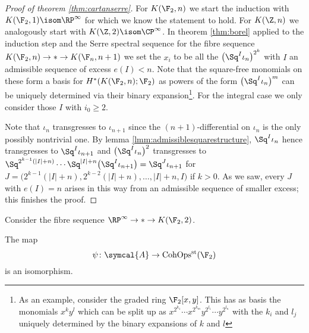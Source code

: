 \begin{proof}[Proof of theorem \ref{thm:cartanserre}]
	For $K(\F_2, n)$ we start the induction with $K(\F_2, 1) \isom \RP^\infty$ for which we know the statement to hold.
	For $K(\Z, n)$ we analogously start with $K(\Z, 2) \isom \CP^\infty$.
	In theorem \ref{thm:borel} applied to the induction step and the Serre spectral sequence for the fibre sequence $K(\F_2, n) \to * \to K(\F_n, n + 1)$ we set the $x_i$ to be all the $\big(\Sq^I \iota_n\big)^{2^k}$ with $I$ an admissible sequence of excess $e(I) < n$.
	Note that the square-free monomials on these form a basis for $H^*(K(\F_2, n); \F_2)$ as powers of the form $\big(\Sq^I \iota_n\big)^m$ can be uniquely determined via their binary expansion\footnote{As an example, consider the graded ring $\F_2[x, y]$. This has as basis the monomials $x^k y^l$ which can be split up as $x^{2^{k_1}} \cdots x^{2^{k_m}} y^{2^{l_1}} \cdots y^{2^{l_n}}$ with the $k_i$ and $l_j$ uniquely determined by the binary expansions of $k$ and $l$}.
	For the integral case we only consider those $I$ with $i_0 \geq 2$.

	Note that $\iota_n$ transgresses to $\iota_{n + 1}$ since the $(n + 1)$-differential on $\iota_n$ is the only possibly nontrivial one.
	By lemma \ref{lmm:admissiblesquarestructure}, $\Sq^I \iota_n$ hence transgresses to $\Sq^I \iota_{n + 1}$ and $\big(\Sq^I \iota_n\big)^2$ transgresses to $\Sq^{2^{k - 1}(|I| + n)} \cdots \Sq^{|I| + n}\big(\Sq^I \iota_{n + 1}\big) = \Sq^J \iota_{n + 1}$ for $J = \big(2^{k - 1}(|I| + n), 2^{k - 2}(|I| + n), \ldots, |I| + n, I\big)$ if $k > 0$.
	As we saw, every $J$ with $e(I) = n$ arises in this way from an admissible sequence of smaller excess; this finishes the proof.
\end{proof}
\begin{example}
	Consider the fibre sequence $\RP^\infty \to * \to K(\F_2, 2)$.
\end{example}
\begin{corollary}
	The map 
	\begin{equation*}
		\psi\colon \symcal{A} \to \CohOpsst(\F_2)
	\end{equation*}
	is an isomorphism.
\end{corollary}
